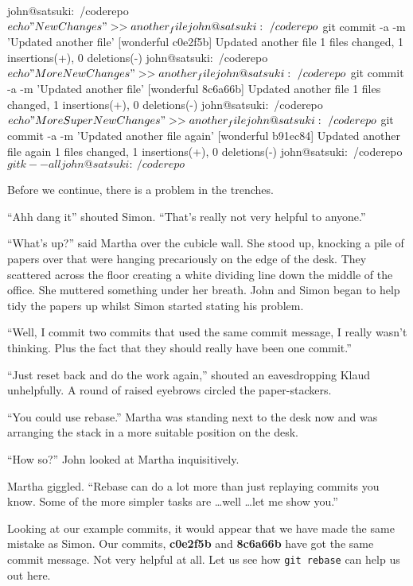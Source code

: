 \begin{code}
john@satsuki:~/coderepo$ echo "New Changes" >> another_file
john@satsuki:~/coderepo$ git commit -a -m 'Updated another file'
[wonderful c0e2f5b] Updated another file
 1 files changed, 1 insertions(+), 0 deletions(-)
john@satsuki:~/coderepo$ echo "More New Changes" >> another_file
john@satsuki:~/coderepo$ git commit -a -m 'Updated another file'
[wonderful 8c6a66b] Updated another file
 1 files changed, 1 insertions(+), 0 deletions(-)
john@satsuki:~/coderepo$ echo "More Super New Changes" >> another_file
john@satsuki:~/coderepo$ git commit -a -m 'Updated another file again'
[wonderful b91ec84] Updated another file again
 1 files changed, 1 insertions(+), 0 deletions(-)
john@satsuki:~/coderepo$ gitk --all
john@satsuki:~/coderepo$
\end{code}

Before we continue, there is a problem in the trenches.

\begin{trenches}
``Ahh dang it'' shouted Simon.
``That's really not very helpful to anyone.''

``What's up?'' said Martha over the cubicle wall.
She stood up, knocking a pile of papers over that were hanging precariously on the edge of the desk.
They scattered across the floor creating a white dividing line down the middle of the office.
She muttered something under her breath.
John and Simon began to help tidy the papers up whilst Simon started stating his problem.

``Well, I commit two commits that used the same commit message, I really wasn't thinking. Plus the fact that they should really have been one commit.''

``Just reset back and do the work again,'' shouted an eavesdropping Klaud unhelpfully.
A round of raised eyebrows circled the paper-stackers.

``You could use rebase.'' Martha was standing next to the desk now and was arranging the stack in a more suitable position on the desk.

``How so?'' John looked at Martha inquisitively.

Martha giggled.
``Rebase can do a lot more than just replaying commits you know. Some of the more simpler tasks are \ldots well \ldots let me show you.''
\end{trenches}

Looking at our example commits, it would appear that we have made the same mistake as Simon.
Our commits, \textbf{c0e2f5b} and \textbf{8c6a66b} have got the same commit message.
Not very helpful at all.
Let us see how \texttt{git rebase} can help us out here.

